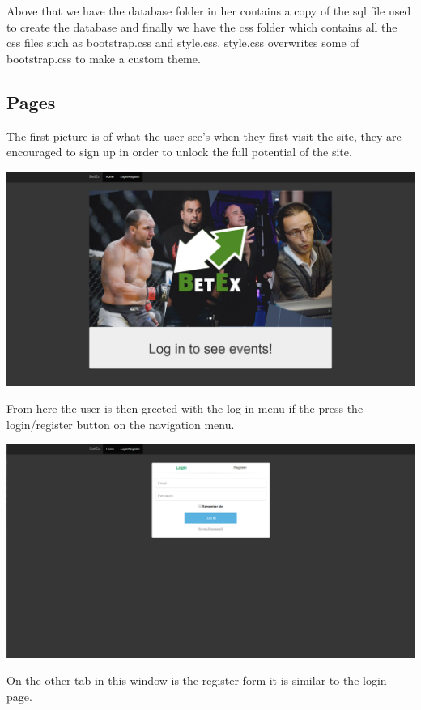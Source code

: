 Above that we have the database folder in her contains a copy of the sql file used to create the database and finally we have the css folder which contains all the css files such as bootstrap.css and style.css, style.css overwrites some of bootstrap.css to make a custom theme.

\subsection{Pages}
The first picture is of what the user see's when they first visit the site, they are encouraged to sign up in order to unlock the full potential of the site.

\includegraphics[width=\textwidth,height=\textheight,keepaspectratio]{img/screenshots/home.png}

From here the user is then greeted with the log in menu if the press the login/register button on the navigation menu.

\includegraphics[width=\textwidth,height=\textheight,keepaspectratio]{img/screenshots/login.png}

On the other tab in this window is the register form it is similar to the login page.

